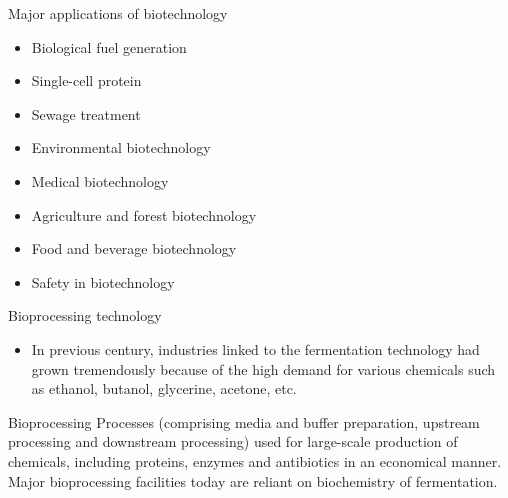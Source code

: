 \documentclass[
  ignorenonframetext,
  aspectratio=169]{beamer}
\providecommand{\tightlist}{%
  \setlength{\itemsep}{0pt}\setlength{\parskip}{0pt}}
\begin{document}
\begin{frame}{Major applications of biotechnology}
\protect\hypertarget{major-applications-of-biotechnology}{}
\begin{itemize}
\tightlist
\item
  Biological fuel generation
\item
  Single-cell protein
\item
  Sewage treatment
\item
  Environmental biotechnology
\item
  Medical biotechnology
\item
  Agriculture and forest biotechnology
\item
  Food and beverage biotechnology
\item
  Safety in biotechnology
\end{itemize}
\end{frame}

\begin{frame}{Bioprocessing technology}
\protect\hypertarget{bioprocessing-technology}{}
\begin{itemize}
\tightlist
\item
  In previous century, industries linked to the fermentation technology
  had grown tremendously because of the high demand for various
  chemicals such as ethanol, butanol, glycerine, acetone, etc.
\end{itemize}

\begin{block}{Bioprocessing}
\protect\hypertarget{bioprocessing}{}
Processes (comprising media and buffer preparation, upstream processing
and downstream processing) used for large-scale production of chemicals,
including proteins, enzymes and antibiotics in an economical manner.
Major bioprocessing facilities today are reliant on biochemistry of
fermentation.
\end{block}
\end{frame}
\end{document}
